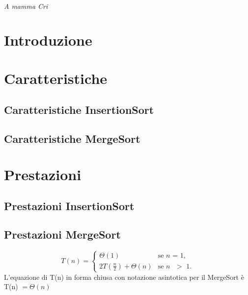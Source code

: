 \documentclass[a4paper,titlepage]{book}
\begin{document}
\begin{frontespizio}
\Logo[2.5cm]{}
\end{frontespizio}

\null{}
\begin{flushright}
\textit{A mamma Cri}
\end{flushright}
\null

\pagebreak

\section{Introduzione}


\section{Caratteristiche}


\subsection{Caratteristiche InsertionSort}

\subsection{Caratteristiche MergeSort}

\section{Prestazioni}
\subsection{Prestazioni InsertionSort}

\subsection{Prestazioni MergeSort}

\begin{equation*}
T(n) = \begin{cases}
\Theta(1) & \text{se $n$ = 1,}\\
2T(\frac{n}{2}) + \Theta(n) & \text{se $n$ $>$ 1.}
\end{cases}
\end{equation*}
L'equazione di T(n) in forma chiusa con notazione asintotica per il MergeSort è T(n) $= \Theta(n)$
\end{document}
